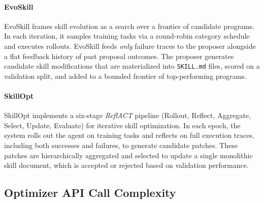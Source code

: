 \documentclass[11pt, a4paper, copyright, gr]{google}
\begin{document}
\paragraph{EvoSkill~\citep{alzubi2026evoskill}}
EvoSkill frames skill evolution as a search over a frontier of candidate programs. In each iteration, it samples training tasks via a round-robin category schedule and executes rollouts. EvoSkill feeds \textit{only} failure traces to the proposer alongside a flat feedback history of past proposal outcomes. The proposer generates candidate skill modifications that are materialized into \texttt{SKILL.md} files, scored on a validation split, and added to a bounded frontier of top-performing programs.

\paragraph{SkillOpt~\citep{yang2026skillopt}}
SkillOpt implements a six-stage \textit{ReflACT} pipeline (Rollout, Reflect, Aggregate, Select, Update, Evaluate) for iterative skill optimization. In each epoch, the system rolls out the agent on training tasks and reflects on full execution traces, including both successes and failures, to generate candidate patches. These patches are hierarchically aggregated and selected to update a single monolithic skill document, which is accepted or rejected based on validation performance.

\subsection{Optimizer API Call Complexity}
\end{document}
